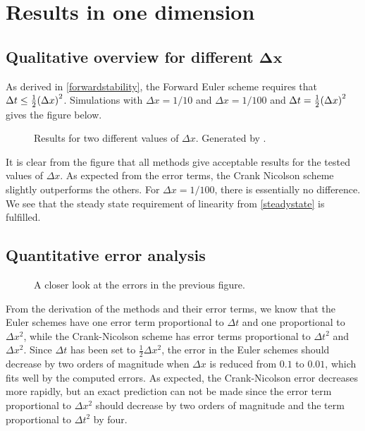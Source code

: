 %
\section{Results in one dimension}
\subsection{Qualitative overview for different \(\boldsymbol{\Delta x}\)}
As derived in \ref{forwardstability}, the Forward Euler scheme requires that \(\Delta t \leq \tfrac{1}{2}\qty(\Delta x)^2\). Simulations with \(\Delta x = 1/10\) and \(\Delta x = 1/100\) and \(\Delta t = \tfrac{1}{2}\qty(\Delta x)^2\) gives the figure below.
\begin{figure}[H]
\centering

\caption{Results for two different values of \(\Delta x\). Generated by .}
\end{figure}
It is clear from the figure that all methods give acceptable results for the tested values of \(\Delta x\). As expected from the error terms, the Crank Nicolson scheme slightly outperforms the others. For \(\Delta x=1/100\), there is essentially no difference. We see that the steady state requirement of linearity from \ref{steadystate} is fulfilled.

\subsection{Quantitative error analysis}
\begin{figure}[H]
\centering

\caption{A closer look at the errors in the previous figure.}
\end{figure}
From the derivation of the methods and their error terms, we know that the Euler schemes have one error term proportional to \(\Delta t\) and one proportional to \(\Delta x^2\), while the Crank-Nicolson scheme has error terms proportional to \(\Delta t^2\) and \(\Delta x^2\). Since \(\Delta t\) has been set to \(\tfrac{1}{2}\Delta x^2\), the error in the Euler schemes should decrease by two orders of magnitude when \(\Delta x\) is reduced from \(\num{0.1}\) to \(\num{0.01}\), which fits well by the computed errors. As expected, the Crank-Nicolson error decreases more rapidly, but an exact prediction can not be made since the error term proportional to \(\Delta x^2\) should decrease by two orders of magnitude and the term proportional to \(\Delta t^2\) by four.


